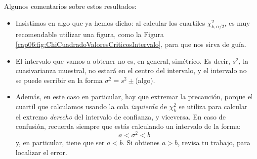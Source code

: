     \begin{center}
    \end{center}
Algunos comentarios sobre estos resultados:
\begin{itemize}
  \item Insistimos en algo que ya hemos dicho: al calcular los cuartiles
      $\chi^2_{k,\alpha/2}$, es muy recomendable utilizar una figura, como la
      Figura \ref{cap06:fig:ChiCuadradoValoresCriticosIntervalo}, para que
      nos sirva de guía.
  \item El intervalo que vamos a obtener no es, en general, simétrico. Es
      decir, $s^2$, la cuasivarianza muestral, no estará en el centro del
      intervalo, y el intervalo {\sf no se puede escribir} en la forma
      $\sigma^2=s^2\pm$(algo).
  \item Además, en este caso en particular, hay que extremar la precaución,
      porque el cuartil que calculamos usando la cola {\em izquierda} de
      $\chi^2_k$ se utiliza para calcular el extremo {\em derecho} del
      intervalo de confianza, y viceversa. En caso de confusión, recuerda
      siempre que estás calculando un intervalo de la forma:
      \[a<\sigma^2<b\]
      y, en particular, tiene que ser $a<b$. Si obtienes $a>b$, revisa tu
      trabajo, para localizar el error.
\end{itemize}

